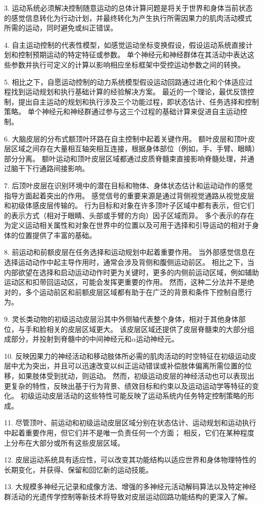 3. 运动系统必须解决控制随意运动的总体计算问题是将关于世界和身体当前状态的感觉信息转化为行动计划，并最终转化为产生执行所需因果力的肌肉活动模式 所需的运动，同时避免或纠正错误。


4. 自主运动控制的代表性模型，如感觉运动坐标变换假设，假设运动系统直接计划和控制预期运动的特定特征或参数。
单个神经元和神经群体在其活动中表达这些参数并执行可定义的计算以影响相应坐标框架中受控运动参数之间的转换。


5. 相比之下，自愿运动控制的动力系统模型假设运动回路通过进化和个体适应过程找到运动规划和执行基础计算的经验解决方案。
最近的一个理论，最优反馈控制，提出自主运动的规划和执行涉及三个功能过程，即状态估计、任务选择和控制策略。
单个神经元和神经群通过参与这三个过程的基础计算来促进自主运动控制。


6. 大脑皮层的分布式额顶叶环路在自主控制中起着关键作用。
额叶皮层和顶叶皮层区域之间存在大量相互轴突相互连接，根据身体部位（例如，手、手臂、眼睛）部分分离。
额叶运动和顶叶皮层区域都通过皮质脊髓束直接影响脊髓处理，并通过脑干下行通路间接影响。


7. 后顶叶皮层在识别环境中的潜在目标和物体、身体状态估计和运动动作的感觉指导方面起着突出的作用。
感觉信号的重要来源是通过背侧视觉通路从视觉皮层和初级体感皮层传输的。
行为目标和对象在许多顶叶子区域中都有表示，但它们的表示方式（相对于眼睛、头部或手臂的方向）因子区域而异。
多个表示的存在为定义运动相关属性和对象在世界中的位置以及可用于选择和引导运动的相对于身体的位置提供了丰富的基础。


8. 前运动和前额皮层在任务选择和运动规划中起着重要作用。
当外部感觉信息在选择运动动作中起主导作用时，通常会涉及背侧和腹侧运动前区。
相比之下，当内部欲望在选择和启动运动动作时更为关键时，更多的内侧前运动区域，例如辅助运动区和扣带回运动区，可能会发挥更重要的作用。
然而，这种二分法并不是绝对的，多个运动前区和前额皮层区域都有助于在广泛的背景和条件下控制自愿行为。


9. 灵长类动物的初级运动皮层沿其中外侧轴代表整个身体，相对于其他身体部位，与手和脸相关的皮层区域更大。
该皮层区域还提供了皮层脊髓束的大部分组成部分，并投射到脊髓中的中间神经元和$ \alpha $运动神经元。


10. 反映因果力的神经活动和移动肢体所必需的肌肉活动的时空特征在初级运动皮层中尤为突出，并且可以迅速改变以纠正运动错误或补偿肢体偏离所需位置的位移，如果肢体受到扰动，则运动。
然而，初级运动皮层的神经活动也可以表现出更复杂的特性，反映出基于行为背景、绩效目标和约束以及运动运动学等特征的变化。
初级运动皮层活动的这些特性可能反映了运动系统内任务特定控制策略的形成。


11. 尽管顶叶、前运动和初级运动皮层区域分别在状态估计、运动规划和运动执行中起着重要作用，但它们并不是唯一负责任何一个方面；
相反，它们在某种程度上分布在大部分或所有这些皮层区域。


12. 皮层运动系统具有适应性，可以改变其功能结构以适应世界和身体物理特性的长期变化，并获得、保留和回忆新的运动技能。


13. 大规模多神经元记录和成像方法、增强的多神经元活动解码算法以及特定神经群活动的光遗传学控制等新技术将导致对皮层运动回路功能结构的更深入了解。

